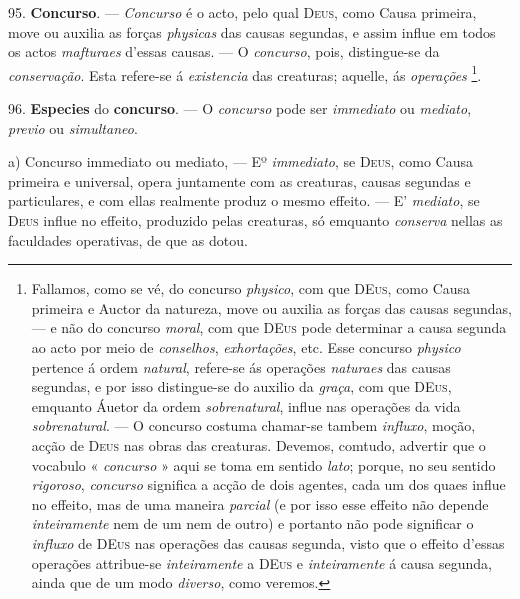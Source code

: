  95. \textbf{Concurso}. --- \emph{Concurso} é o acto, pelo qual \textsc{Deus}, como Causa primeira, move ou auxilia as forças \emph{physicas} das causas segundas, e assim influe em todos os actos \emph{mafturaes} d'essas causas. --- O \emph{concurso}, pois, distingue-se da \emph{conservação}. Esta refere-se á \emph{existencia} das creaturas; aquelle, ás \emph{operações} \footnote{Fallamos, como se vé, do concurso \emph{physico}, com que \textsc{DEus}, como Causa primeira e Auctor da natureza, move ou auxilia as forças das causas segundas, --- e não do concurso \emph{moral}, com que \textsc{DEus} pode determinar a causa segunda ao acto por meio de \emph{conselhos}, \emph{exhortações}, etc. Esse concurso \emph{physico} pertence á ordem \emph{natural}, refere-se ás operações \emph{naturaes} das causas segundas, e por isso distingue-se do auxilio da \emph{graça}, com que \textsc{DEus}, emquanto Áuetor da ordem \emph{sobrenatural}, influe nas operações da vida \emph{sobrenatural}. --- O concurso costuma chamar-se tambem \emph{influxo}, moção, acção de \textsc{Deus} nas obras das creaturas. Devemos, comtudo, advertir que o vocabulo « \emph{concurso} » aqui se toma em sentido \emph{lato}; porque, no seu sentido \emph{rigoroso}, \emph{concurso} significa a acção de dois agentes, cada um dos quaes influe no effeito, mas de uma maneira \emph{parcial} (e por isso esse effeito não depende \emph{inteiramente} nem de um nem de outro) e portanto não pode significar o \emph{influxo} de \textsc{DEus} nas operações das causas segunda, visto que o effeito d'essas operações attribue-se \emph{inteiramente} a \textsc{DEus} e \emph{inteiramente} á causa segunda, ainda que de um modo \emph{diverso}, como veremos.}.

96. \textbf{Especies} do \textbf{concurso}. --- O \emph{concurso} pode ser \emph{immediato} ou \emph{mediato}, \emph{previo} ou \emph{simultaneo}.

a) Concurso immediato ou mediato, --- Eº \emph{immediato}, se \textsc{Deus}, como Causa primeira e universal, opera juntamente com as creaturas, causas segundas e particulares, e com ellas realmente produz o mesmo effeito. --- E' \emph{mediato}, se \textsc{Deus} influe no effeito, produzido pelas creaturas, só emquanto \emph{conserva} nellas as faculdades operativas, de que as dotou.

